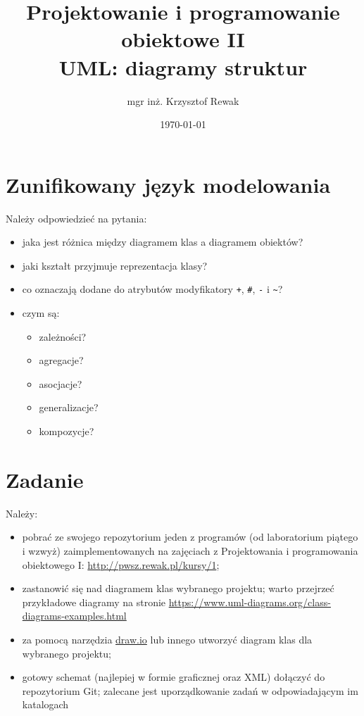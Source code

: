 \documentclass{article}
\title{
	Projektowanie i programowanie obiektowe II\\
	\Huge{UML: diagramy struktur}
}
\author{mgr inż. Krzysztof Rewak}
\date{\today}
\begin{document}
	\maketitle

	\section{Zunifikowany język modelowania}
	Należy odpowiedzieć na pytania:
	\begin{itemize}
		\item jaka jest różnica między diagramem klas a diagramem obiektów?
		\item jaki kształt przyjmuje reprezentacja klasy?
		\item co oznaczają dodane do atrybutów modyfikatory \texttt{+}, \texttt{\#}, \texttt{-} i \texttt{\~}?
		\item czym są:
		\begin{itemize}
			\item zależności?
			\item agregacje?
			\item asocjacje?
			\item generalizacje?
			\item kompozycje?
		\end{itemize}
	\end{itemize}
	
	\section{Zadanie}
	Należy:
	\begin{itemize}
		\item pobrać ze swojego repozytorium jeden z programów (od laboratorium piątego i wzwyż) zaimplementowanych na zajęciach z Projektowania i programowania obiektowego I: \url{http://pwsz.rewak.pl/kursy/1};
		\item zastanowić się nad diagramem klas wybranego projektu; warto przejrzeć przykładowe diagramy na stronie \url{https://www.uml-diagrams.org/class-diagrams-examples.html}
		\item za pomocą narzędzia \href{https://www.draw.io/}{draw.io} lub innego utworzyć diagram klas dla wybranego projektu;
		\item gotowy schemat (najlepiej w formie graficznej oraz XML) dołączyć do repozytorium Git; zalecane jest uporządkowanie zadań w odpowiadającym im katalogach
	\end{itemize}
	
\end{document}
